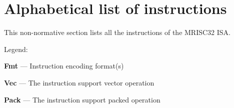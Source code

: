 %

\onecolumn

\chapter{Alphabetical list of instructions}

This non-normative section lists all the instructions of the MRISC32 ISA.

Legend:
\begin{bulletitems}
  \item{\textbf{Fmt} --- Instruction encoding format(s)}
  \item{\textbf{Vec} --- The instruction support vector operation}
  \item{\textbf{Pack} --- The instruction support packed operation}
\end{bulletitems}



\twocolumn
